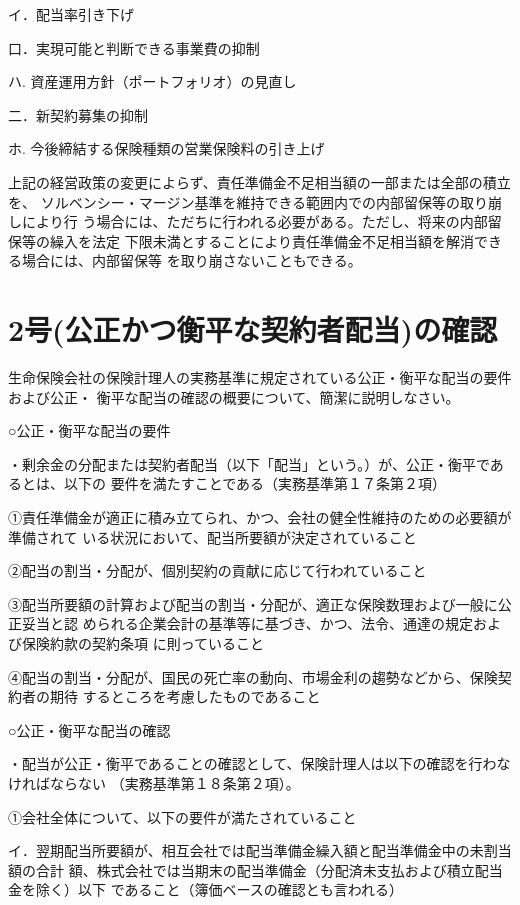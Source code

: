 \documentclass[report,gutter=10mm,fore-edge=10mm,uplatex,dvipdfmx]{jlreq}
\begin{document}
イ．配当率引き下げ

口．実現可能と判断できる事業費の抑制

ハ. 資産運用方針（ポートフォリオ）の見直し

二．新契約募集の抑制

ホ. 今後締結する保険種類の営業保険料の引き上げ

上記の経営政策の変更によらず、責任準備金不足相当額の一部または全部の積立を、
ソルベンシー・マージン基準を維持できる範囲内での内部留保等の取り崩しにより行
う場合には、ただちに行われる必要がある。ただし、将来の内部留保等の繰入を法定
下限未満とすることにより責任準備金不足相当額を解消できる場合には、内部留保等
を取り崩さないこともできる。


\section{2号(公正かつ衡平な契約者配当)の確認}

生命保険会社の保険計理人の実務基準に規定されている公正・衡平な配当の要件および公正・
衡平な配当の確認の概要について、簡潔に説明しなさい。

\answer{}
○公正・衡平な配当の要件

・剰余金の分配または契約者配当（以下「配当」という。）が、公正・衡平であるとは、以下の
要件を満たすことである（実務基準第１７条第２項）

①責任準備金が適正に積み立てられ、かつ、会社の健全性維持のための必要額が準備されて
いる状況において、配当所要額が決定されていること

②配当の割当・分配が、個別契約の貢献に応じて行われていること

③配当所要額の計算および配当の割当・分配が、適正な保険数理および一般に公正妥当と認
められる企業会計の基準等に基づき、かつ、法令、通達の規定および保険約款の契約条項
に則っていること

④配当の割当・分配が、国民の死亡率の動向、市場金利の趨勢などから、保険契約者の期待
するところを考慮したものであること

○公正・衡平な配当の確認

・配当が公正・衡平であることの確認として、保険計理人は以下の確認を行わなければならない
（実務基準第１８条第２項）。

①会社全体について、以下の要件が満たされていること

イ．翌期配当所要額が、相互会社では配当準備金繰入額と配当準備金中の未割当額の合計
額、株式会社では当期末の配当準備金（分配済未支払および積立配当金を除く）以下
であること（簿価ベースの確認とも言われる）
\end{document}
